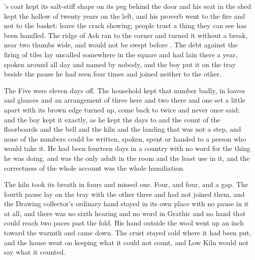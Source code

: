 's coat kept its salt-stiff shape on its peg behind the door and his seat in the shed kept the hollow of twenty years on the left, and his proverb went to the fire and not to the basket: leave the crack showing; people trust a thing they can see has been handled. The ridge of Ash ran to the corner and turned it without a break, near two thumbs wide, and would not be swept before . The debt against the firing of tiles lay uncalled somewhere in the square and had lain there a year, spoken around all day and named by nobody, and the boy put it on the tray beside the pause he had seen four times and joined neither to the other.

The Five were eleven days off. The household kept that number badly, in loaves and glances and an arrangement of three here and two there and one set a little apart with its brown edge turned up, come back to twice and never once said; and the boy kept it exactly, as he kept the days to  and the count of the floorboards and the bell and the kiln and the landing that was not a step, and none of the numbers could be written, spoken, spent or handed to a person who would take it. He had been fourteen days in a country with no word for the thing he was doing, and was the only adult in the room and the least use in it, and the correctness of the whole account was the whole humiliation.

The kiln took its breath in fours and missed one. Four, and four, and a gap. The fourth pause lay on the tray with the other three and had not joined them, and the Drawing collector's ordinary hand stayed in its own place with no pause in it at all, and there was no sixth hearing and no word in Grathic and no hand that could reach two paces past the fold. His hand outside the wool went up an inch toward the warmth and came down. The crust stayed cold where it had been put, and the house went on keeping what it could not count, and Low Kiln would not say what it counted.
